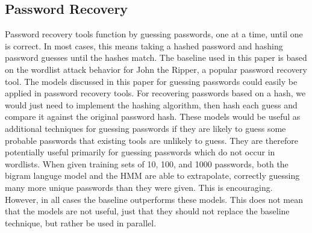 \documentclass{amsart}
\theoremstyle{definition}
\theoremstyle{remark}
\numberwithin{equation}{section}
\begin{document}
\subsection{Password Recovery}
Password recovery tools function by guessing passwords, one at a time, until one is correct. In most cases, this means taking a hashed password and hashing password guesses until the hashes match. The baseline used in this paper is based on the wordlist attack behavior for John the Ripper, a popular password recovery tool. The models discussed in this paper for guessing passwords could easily be applied in password recovery tools. For recovering passwords based on a hash, we would just need to implement the hashing algorithm, then hash each guess and compare it against the original password hash.
These models would be useful as additional techniques for guessing passwords if they are likely to guess some probable passwords that existing tools are unlikely to guess. They are therefore potentially useful primarily for guessing passwords which do not occur in wordlists.
When given training sets of 10, 100, and 1000 passwords, both the bigram languge model and the HMM are able to extrapolate, correctly guessing many more unique passwords than they were given. This is encouraging. However, in all cases the baseline outperforms these models. This does not mean that the models are not useful, just that they should not replace the baseline technique, but rather be used in parallel.
\end{document}
